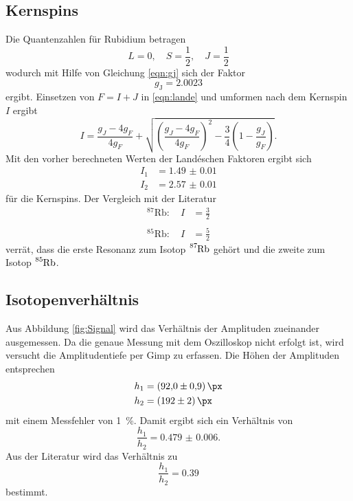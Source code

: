  \subsection{Kernspins}
 Die Quantenzahlen für Rubidium betragen
 \begin{equation*}
 L = 0,\quad S = \frac{1}{2},\quad J = \frac{1}{2}
 \end{equation*}
 wodurch mit Hilfe von Gleichung \eqref{eqn:gj} sich der Faktor
 \begin{equation*}
 g_{\text{J}}=\num{2.0023}
 \end{equation*}
 ergibt.
 Einsetzen von $F=I+J$ in \eqref{eqn:lande} und umformen nach dem Kernspin $I$ ergibt
 \begin{equation}
 I=\frac{g_J-4g_F}{4g_F} + \sqrt{\left(\frac{g_J-4g_F}{4g_F}\right)^2-\frac{3}{4}\left(1-\frac{g_J}{g_F}\right)}.
 \end{equation}
 Mit den vorher berechneten Werten der Landéschen Faktoren ergibt sich
 \begin{align*}
 I_1 &= \num{1.49(1)}\\
 I_2 &= \num{2.57(1)} 
 \end{align*}
 für die Kernspins.
 Der Vergleich mit der Literatur \cite{nudat2}
\begin{align*}
{}^{87}\text{Rb}:\quad I&=\frac{3}{2}\\
\\
{}^{85}\text{Rb}:\quad I&=\frac{5}{2}
\end{align*}
verrät, dass die erste Resonanz zum Isotop $\ce{^{87}Rb}$ gehört und die zweite zum Isotop $\ce{^{85}Rb}$.
\subsection{Isotopenverhältnis}
Aus Abbildung \ref{fig:Signal} wird das Verhältnis der Amplituden zueinander ausgemessen.
Da die genaue Messung mit dem Oszilloskop nicht erfolgt ist, wird versucht die Amplitudentiefe per Gimp \cite{gimp} zu erfassen.
Die Höhen der Amplituden entsprechen
\begin{align*}
h_1&=\SI{92.0(9)}{\px}\\
h_2&=\SI{192(2)}{\px}
\end{align*}
mit einem Messfehler von \SI{1}{\percent}.
Damit ergibt sich ein Verhältnis von
\begin{equation}
  \frac{h_1}{h_2}=\num{0.479(6)}.
\end{equation}
Aus der Literatur \cite{nudat2} wird das Verhältnis zu 
\begin{equation}
  \frac{h_1}{h_2}=\num{0.39}
\end{equation}
bestimmt.
